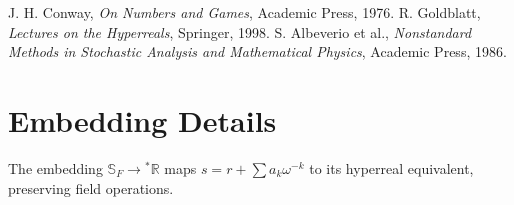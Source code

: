 \documentclass{article}
\begin{document}
\begin{thebibliography}{9}
 J. H. Conway, \emph{On Numbers and Games}, Academic Press, 1976.
 R. Goldblatt, \emph{Lectures on the Hyperreals}, Springer, 1998.
 S. Albeverio et al., \emph{Nonstandard Methods in Stochastic Analysis and Mathematical Physics}, Academic Press, 1986.
\end{thebibliography}

\appendix
\section{Embedding Details}
The embedding \(\mathbb{S}_F \to {}^*\mathbb{R}\) maps \(s = r + \sum a_k \omega^{-k}\) to its hyperreal equivalent, preserving field operations.
\end{document}
